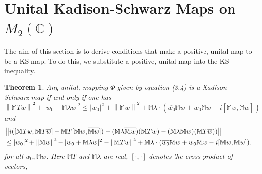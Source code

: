 \documentclass[11pt,reqno]{amsart}
\newtheorem{theorem}[subsection]{Theorem}
\theoremstyle{definition}
\numberwithin{equation}{section} \setcounter{tocdepth}{1}
\def\bm{{\mathbb M}}
\newcommand{\norm}[1]{\left \lVert #1 \right \rVert}
\numberwithin{equation}{section}
\begin{document}
\section{Unital Kadison-Schwarz Maps on $M_2(\mathbb{C})$}

The aim of this section is to derive conditions that make a positive, unital map to be a KS map. To do this, we substitute a positive, unital map into the KS inequality.
\begin{theorem}\label{KS1}
    Any unital, mapping $\Phi$ given by equation (3.4) is a Kadison-Schwarz map if and only if one has \begin{equation}
        \norm{\bm{Tw}}^2+|w_0+\bm{\lambda w}|^2\leq |w_0|^2+\norm{\bm{w}}^2 + \bm{\lambda} \cdot (\overline{w_0}\bm{w}+w_0\overline{\bm{w}}-i[\bm{w},\overline{\bm{w}}])
    \end{equation}  and
    \begin{align}
    &\norm{i([\bm{Tw},\bm{T\overline{w}}]-\bm{T}[\bm{w},\overline{\bm{w}}])-(\bm{\lambda}\overline{\bm{w}})(\bm{Tw})-(\bm{\lambda}\bm{w})(\bm{T\overline{w}}))} \notag\\
    &\leq |w_0|^2+\norm{\bm{w}}^2-|w_0+\bm{\lambda w}|^2-\norm{\bm{Tw}}^2
    +\bm{\lambda} \cdot (\overline{w_0}\bm{w}+w_0\overline{\bm{w}}-i[\bm{w},\overline{\bm{w}}]).
    \end{align}
    for all $w_0, \bm{w}$. Here $\bm{T}$ and $\bm{\lambda}$ are real,  $[\cdot,\cdot]$ denotes the cross product of vectors,
\end{theorem}
\end{document}
